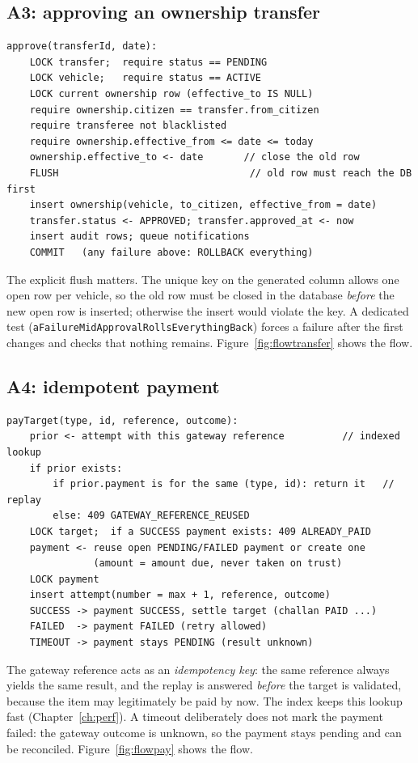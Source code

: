 \subsection{A3: approving an ownership transfer}
\begin{lstlisting}[language={},mathescape=false]
approve(transferId, date):
    LOCK transfer;  require status == PENDING
    LOCK vehicle;   require status == ACTIVE
    LOCK current ownership row (effective_to IS NULL)
    require ownership.citizen == transfer.from_citizen
    require transferee not blacklisted
    require ownership.effective_from <= date <= today
    ownership.effective_to <- date       // close the old row
    FLUSH                                 // old row must reach the DB first
    insert ownership(vehicle, to_citizen, effective_from = date)
    transfer.status <- APPROVED; transfer.approved_at <- now
    insert audit rows; queue notifications
    COMMIT   (any failure above: ROLLBACK everything)
\end{lstlisting}
The explicit flush matters. The unique key on the generated column
 allows one open row per vehicle, so the old row must be
closed in the database \emph{before} the new open row is inserted; otherwise the insert would
violate the key. A dedicated test (\texttt{aFailureMidApprovalRollsEverythingBack}) forces
a failure after the first changes and checks that nothing remains. Figure~\ref{fig:flowtransfer}
shows the flow.


\subsection{A4: idempotent payment}
\begin{lstlisting}[language={},mathescape=false]
payTarget(type, id, reference, outcome):
    prior <- attempt with this gateway reference          // indexed lookup
    if prior exists:
        if prior.payment is for the same (type, id): return it   // replay
        else: 409 GATEWAY_REFERENCE_REUSED
    LOCK target;  if a SUCCESS payment exists: 409 ALREADY_PAID
    payment <- reuse open PENDING/FAILED payment or create one
               (amount = amount due, never taken on trust)
    LOCK payment
    insert attempt(number = max + 1, reference, outcome)
    SUCCESS -> payment SUCCESS, settle target (challan PAID ...)
    FAILED  -> payment FAILED (retry allowed)
    TIMEOUT -> payment stays PENDING (result unknown)
\end{lstlisting}
The gateway reference acts as an \emph{idempotency key}: the same reference always yields
the same result, and the replay is answered \emph{before} the target is validated, because
the item may legitimately be paid by now. The  index keeps this
lookup fast (Chapter~\ref{ch:perf}). A timeout deliberately does not mark the payment failed:
the gateway outcome is unknown, so the payment stays pending and can be reconciled.
Figure~\ref{fig:flowpay} shows the flow.

